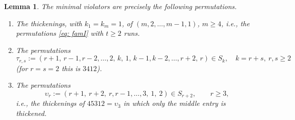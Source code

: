 \documentclass[10pt,a4paper]{amsart}
\newtheorem{lemma}{Lemma}
\begin{document}
\begin{lemma} \label{lem: minviol}
The minimal violators are precisely the following permutations.
\begin{enumerate}
\item \label{part: mvI} The thickenings, with $k_1=k_m=1$, of $(m,2,\dots,m-1,1)$, $m\ge4$, i.e., the permutations \cref{eq: famI} with $t\ge2$ runs.
\item \label{part: mvII} The permutations
\[
\tau_{r,s}:=(r+1,\,r-1,r-2,\dots,2,\,k,\,1,\,k-1,k-2,\dots,r+2,\,r)\in S_k,\quad k=r+s,\ r,s\ge2
\]
(for $r=s=2$ this is $3412$).
\item \label{part: mvIII} The permutations
\[
\upsilon_r:=(r+1,\ r+2,\ r,r-1,\dots,3,\ 1,\ 2)\in S_{r+2},\qquad r\ge3,
\]
i.e., the thickenings of $45312=\upsilon_3$ in which only the middle entry is thickened.
\end{enumerate}
\end{lemma}
\end{document}
